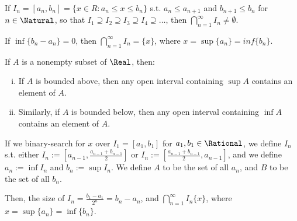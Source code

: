 
\begin{namedtheorem} \leavevmode \\
  If $I_n = [a_n, b_n] = \{x \in R : a_n \leq x \leq b_n\}$ s.t. $a_n \leq a_{n + 1}$ and $b_{n+1} \leq b_n$ for $n \in \Natural$, so that $I_1 \supseteq I_2 \supseteq I_3 \supseteq I_4 \supseteq \ldots$, then $\displaystyle \bigcap_{n=1}^{\infty}I_n \neq \emptyset$.

  If $\inf \{b_n - a_n\} = 0$, then $\displaystyle \bigcap_{n=1}^{\infty}I_n = \{x\}$, where $x = \sup \{a_n\} = inf \{ b_n \}$.
\end{namedtheorem}


\begin{namedtheorem} If $A$ is a nonempty subset of $\Real$, then:
  \begin{enumerate}[(i)]
    \item If $A$ is bounded above, then any open interval containing $\sup A$ contains an element of $A$.
    \item Similarly, if $A$ is bounded below, then any open interval containing $\inf A$ contains an element of $A$.
  \end{enumerate}
\end{namedtheorem}


\begin{theorem}
If we binary-search for $x$ over $I_1 = [a_1, b_1]$ for $a_1, b_1 \in \Rational$, 
we define $I_n$ s.t. either $I_n := [a_{n-1}, \frac{a_{n-1} + b_{n-1}}{2}]$ or 
$I_n := [\frac{a_{n-1} + b_{n-1}}{2}, a_{n-1}]$, and we define $a_n := \inf I_n$ 
and $b_n := \sup I_n$. We define $A$ to be the set of all $a_n$, and $B$ to be 
the set of all $b_n$.

Then, the size of $I_n = \frac{b_1 - a_1}{2^n} = b_n - a_n$, and $\displaystyle \bigcap_{n=1}^{\infty}I_n \{x\}$, where $x = \sup \{a_n\} = \inf \{ b_n \}$.
\end{theorem}

